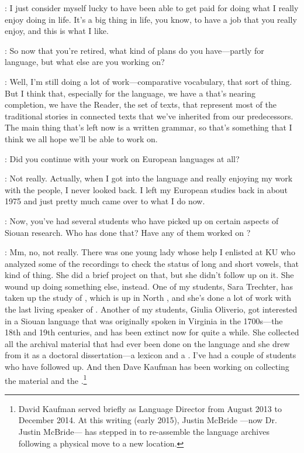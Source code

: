 \documentclass[output=paper]{LSP/langsci}
\begin{document}
: I just consider myself lucky to have been able to get paid for doing what I really enjoy doing in life. It's a big thing in life, you know, to have a job that you really enjoy, and this is what I like.

: So now that you're retired, what kind of plans do you have---partly for  language, but what else are you working on?

: Well, I'm still doing a lot of work---comparative vocabulary, that sort of thing. But I think that, especially for the  language, we have a  that's nearing completion, we have the Reader, the set of  texts, that represent most of the traditional stories in connected texts that we've inherited from our predecessors. The main thing that's left now is a written grammar, so that's something that I think we all hope we'll be able to work on.

: Did you continue with your work on European languages at all?

: Not really. Actually, when I got into the  language and really enjoying my work with the  people, I never looked back. I left my European studies back in about 1975 and just pretty much came over to what I do now.

: Now, you've had several students who have picked up on certain aspects of Siouan research. Who has done that? Have any of them worked on ?

: Mm, no, not really. There was one young lady whose help I enlisted at KU who analyzed some of the recordings to check the status of long and short vowels, that kind of thing. She did a brief project on that, but she didn't follow up on it. She wound up doing something else, instead. One of my students, Sara Trechter, has taken up the study of , which is up in North , and she's done a lot of work with the last living speaker of . Another of my students, Giulia Oliverio, got interested in a Siouan language that was originally spoken in Virginia in the 1700s---the 18th and 19th centuries, and has been extinct now for quite a while. She collected all the archival material that had ever been done on the  language and she drew from it as a doctoral dissertation---a lexicon and a . I've had a couple of students who have followed up. And then Dave Kaufman has been working on collecting the  material and the  .\footnote{David Kaufman served briefly as  Language Director from August 2013 to December 2014. At this writing (early 2015), Justin McBride ---now Dr. Justin McBride--- has stepped in to re-assemble the  language archives following a physical move to a new location.}
\end{document}
